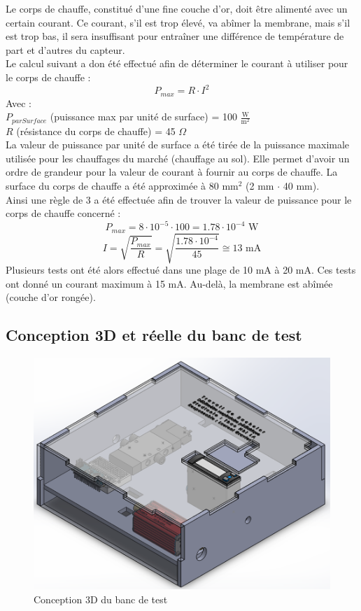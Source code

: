Le corps de chauffe, constitué d'une fine couche d'or, doit être alimenté avec un certain courant. Ce courant, s'il est trop élevé, va abîmer la
membrane, mais s'il est trop bas, il sera insuffisant pour entraîner une différence de température de part et d'autres du capteur. \\

Le calcul suivant a don été effectué afin de déterminer le courant à utiliser pour le corps de chauffe :
\[P_{max} = R\cdot I^2\]
Avec :\\
$P_{parSurface}$ (puissance max par unité de surface) = 100 $\frac{\text{W}}{\text{m}^2}$\\
$R$ (résistance du corps de chauffe) = 45 $\Omega$\\

La valeur de puissance par unité de surface a été tirée de la puissance maximale utilisée pour les chauffages du marché (chauffage au sol).
Elle permet d'avoir un ordre de grandeur pour la valeur de courant à fournir au corps de chauffe.
La surface du corps de chauffe a été approximée à 80 mm$^2$ (2 mm $\cdot$ 40 mm).\\
Ainsi une règle de 3 a été effectuée afin de trouver la valeur de puissance pour le corps de chauffe concerné :
\[P_{max} = 8\cdot 10^{-5}\cdot 100 = 1.78\cdot 10^{-4} \text{ W}\]
\[I = \sqrt{\frac{P_{max}}{R}} = \sqrt{\frac{1.78\cdot 10^{-4}}{45}} \cong 13\text{ mA}\]
Plusieurs tests ont été alors effectué dans une plage de 10 mA à 20 mA. Ces tests ont donné un courant maximum à 15 mA. Au-delà, la membrane
est abîmée (couche d'or rongée).\\

\subsection{Conception 3D et réelle du banc de test}
\begin{figure}[H]
    \centering
    \includegraphics[scale = 0.5]{assets/figures/Banc_de_test.png}
    \caption{Conception 3D du banc de test}
    \label{fig:3D_banc_test}
\end{figure}

